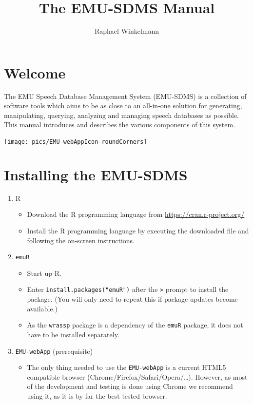 \documentclass[]{book}
\title{The EMU-SDMS Manual}
\author{Raphael Winkelmann}
\date{}
\providecommand{\tightlist}{%
  \setlength{\itemsep}{0pt}\setlength{\parskip}{0pt}}
\begin{document}
\maketitle

{
\setcounter{tocdepth}{1}
\tableofcontents
}
\hypertarget{welcome}{%
\chapter*{Welcome}\label{welcome}}

The EMU Speech Database Management System (EMU-SDMS) is a collection of software tools which aims to be as close to an all-in-one solution for generating, manipulating, querying, analyzing and managing speech databases as possible. This manual introduces and describes the various components of this system.

\begin{center}\texttt{[image: pics/EMU-webAppIcon-roundCorners]} \end{center}

\hypertarget{installing-the-emu-sdms}{%
\chapter{Installing the EMU-SDMS}\label{installing-the-emu-sdms}}

\begin{enumerate}
\def\labelenumi{\arabic{enumi}.}
\tightlist
\item
  R

  \begin{itemize}
  \tightlist
  \item
    Download the R programming language from \url{https://cran.r-project.org/}
  \item
    Install the R programming language by executing the downloaded file and following the on-screen instructions.
  \end{itemize}
\item
  \texttt{emuR}

  \begin{itemize}
  \tightlist
  \item
    Start up R.
  \item
    Enter \texttt{install.packages("emuR")} after the \texttt{\textgreater{}} prompt to install the package. (You will only need to repeat this if package updates become available.)
  \item
    As the \texttt{wrassp} package is a dependency of the \texttt{emuR} package, it does not have to be installed separately.
  \end{itemize}
\item
  \texttt{EMU-webApp} (prerequisite)

  \begin{itemize}
  \tightlist
  \item
    The only thing needed to use the \texttt{EMU-webApp} is a current HTML5 compatible browser (Chrome/Firefox/Safari/Opera/\ldots{}). However, as most of the development and testing is done using Chrome we recommend using it, as it is by far the best tested browser.
  \end{itemize}
\end{enumerate}
\end{document}
